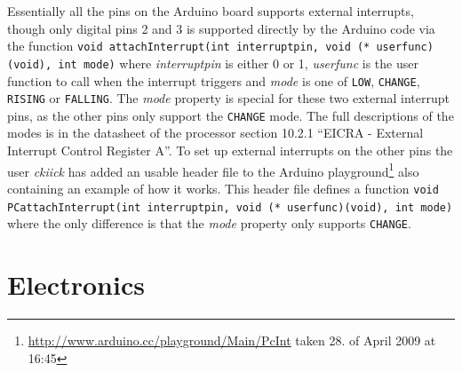 \documentclass[a4paper, oneside, draft]{memoir}
\begin{document}
Essentially all the pins on the Arduino board supports external
interrupts, though only digital pins 2 and 3 is supported directly by
the Arduino code via the function \texttt{void attachInterrupt(int
  interruptpin, void (* userfunc)(void), int mode)} where
\textit{interruptpin} is either 0 or 1, \textit{userfunc} is the user
function to call when the interrupt triggers and \textit{mode} is one
of \texttt{LOW}, \texttt{CHANGE}, \texttt{RISING} or
\texttt{FALLING}. The \textit{mode} property is special for these two
external interrupt pins, as the other pins only support the
\texttt{CHANGE} mode. The full descriptions of the modes is in the
datasheet of the processor section 10.2.1 ``EICRA - External Interrupt
Control Register A''. To set up external interrupts on the other pins
the user \textit{ckiick} has added an usable header file to the Arduino
playground\footnote{\url{http://www.arduino.cc/playground/Main/PcInt}
  taken 28. of April 2009 at 16:45} also containing an
example of how it works. This header file defines a function
\texttt{void PCattachInterrupt(int interruptpin, void (*
  userfunc)(void), int mode)} where the only difference is that the
\textit{mode} property only supports \texttt{CHANGE}.


\section{Electronics}
\end{document}
